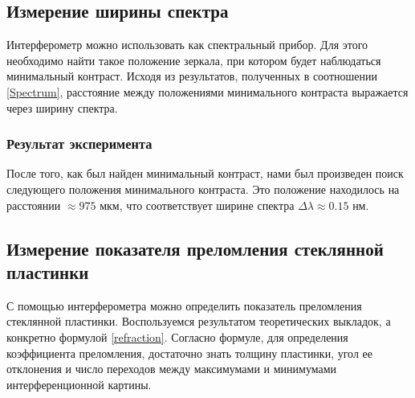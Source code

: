 \documentclass[%
reprint,
russian,
 amsmath,amssymb,
 aps,
]{revtex4-2}
\begin{document}
\subsection{Измерение ширины спектра}
Интерферометр можно использовать как спектральный прибор. Для этого необходимо найти такое положение зеркала, при котором будет наблюдаться минимальный контраст. Исходя из результатов, полученных в соотношении \ref{Spectrum}, расстояние между положениями минимального контраста выражается через ширину спектра.
\subsubsection{Результат эксперимента}
После того, как был найден минимальный контраст, нами был произведен поиск следующего положения минимального контраста. Это положение находилось на расстоянии $\approx 975$ мкм, что соответствует ширине спектра $\Delta \lambda \approx 0.15$ нм.
\subsection{Измерение показателя преломления стеклянной пластинки}
С помощью интерферометра можно определить показатель преломления стеклянной пластинки. Воспользуемся результатом теоретических выкладок, а конкретно формулой \ref{refraction}. Согласно формуле, для определения коэффициента преломления, достаточно знать толщину пластинки, угол ее отклонения и число переходов между максимумами и минимумами интерференционной картины.
\end{document}
